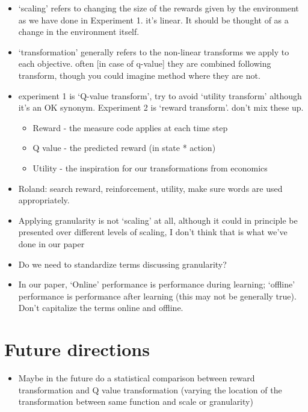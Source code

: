 \begin{itemize}
    \item `scaling' refers to changing the size of the rewards given by the environment as we have done in Experiment 1. it's linear. It should be thought of as a change in the environment itself.
    \item `transformation' generally refers to the non-linear transforms we apply to each objective. often [in case of q-value] they are combined following transform, though you could imagine method where they are not.
    \item experiment 1 is `Q-value transform', try to avoid `utility transform' although it's an OK synonym. Experiment 2 is `reward transform'. don't mix these up.
    \begin{itemize}
        \item Reward - the measure code applies at each time step
        \item Q value - the predicted reward (in state * action)
        \item Utility - the inspiration for our transformations from economics
    \end{itemize}
    \item Roland: search reward, reinforcement, utility, make sure words are used appropriately.
    \item Applying granularity is not `scaling' at all, although it could in principle be presented over different levels of scaling, I don't think that is what we've done in our paper
    \item Do we need to standardize terms discussing granularity?
    \item In our paper, `Online' performance is performance during learning; `offline' performance is performance after learning (this may not be generally true). Don't capitalize the terms online and offline.
    
\end{itemize}

\section{Future directions}

\begin{itemize}
    \item Maybe in the future do a statistical comparison between reward transformation and Q value transformation (varying the location of the transformation between same function and scale or granularity)
\end{itemize}
 
